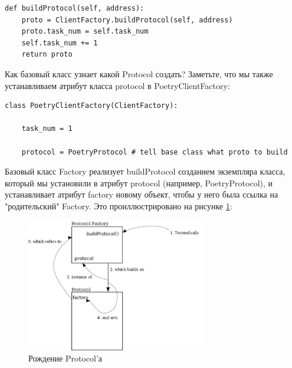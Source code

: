 \begin{scriptsize}\begin{verbatim}
def buildProtocol(self, address):
    proto = ClientFactory.buildProtocol(self, address)
    proto.task_num = self.task_num
    self.task_num += 1
    return proto
\end{verbatim}\end{scriptsize}


Как базовый класс узнает какой Protocol создать? Заметьте, что 
мы также устанавливаем атрибут класса protocol в PoetryClientFactory:

\begin{scriptsize}\begin{verbatim}
class PoetryClientFactory(ClientFactory):

    task_num = 1

    protocol = PoetryProtocol # tell base class what proto to build
\end{verbatim}\end{scriptsize}


Базовый класс Factory реализует buildProtocol 
созданием экземпляра класса, который мы установили в 
атрибут protocol (например, PoetryProtocol), и 
устанавливает атрибут factory новому объект, чтобы 
у него была ссылка на "родительский" Factory. Это проиллюстрировано 
на рисунке \ref{fig:protocols-1}:  

\begin{figure}[h]
\begin{center}
    \includegraphics[width=0.7\textwidth]{images/protocols-1.pdf}
    \caption{Рождение Protocol'а\label{fig:protocols-1}}
\end{center}
\end{figure}


